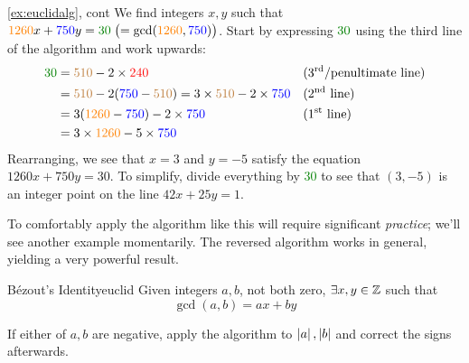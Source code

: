 \begin{example*}{\ref{ex:euclidalg}, cont}{}
	We find integers $x,y$ such that $\textcolor{orange}{1260}x+\textcolor{blue}{750}y=\textcolor{Green}{30} \bigm(=\gcd(\textcolor{orange}{1260},\textcolor{blue}{750})\bigr)$.\smallbreak
	Start by expressing $\textcolor{Green}{30}$ using the third line of the algorithm and work upwards:
	\begin{align*}
		\textcolor{Green}{30} &=\textcolor{brown}{510}-2\times\textcolor{red}{240} & &\text{(3\rd/penultimate line)}\\
		&=\textcolor{brown}{510}-2(\textcolor{blue}{750}-\textcolor{brown}{510}) =3\times \textcolor{brown}{510}-2\times \textcolor{blue}{750} &&\text{(2\nd{} line)}\\
		&=3(\textcolor{orange}{1260}-\textcolor{blue}{750})-2\times \textcolor{blue}{750} &&\text{(1\st{} line)}\\
		&=3\times \textcolor{orange}{1260}-5\times \textcolor{blue}{750}
	\end{align*}
	Rearranging, we see that $x=3$ and $y=-5$ satisfy the equation $1260x+750y=30$. To simplify, divide everything by \textcolor{Green}{30} to see that $(3,-5)$ is an integer point on the line $42x+25y=1$.
\end{example*}

To comfortably apply the algorithm like this will require significant \emph{practice}; we'll see another example momentarily. The reversed algorithm works in general, yielding a very powerful result.

\begin{cor}{Bézout's Identity}{euclid}
	Given integers $a,b$, not both zero, $\exists x,y\in\mathbb{Z}$ such that\vspace{-8pt}
	\[
		\gcd(a,b)=ax+by
	\]
\end{cor}

If either of $a,b$ are negative, apply the algorithm to $\left| a\right|,\left| b\right|$ and correct the signs afterwards.


